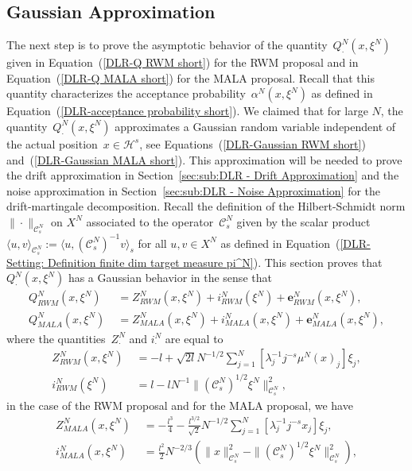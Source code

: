 \subsection{Gaussian Approximation}
\label{sec:sub:DLR - Gaussian approximation}

The next step is to prove the asymptotic behavior of the quantity~$Q^N_{\cdot}(x, \xi^N)$ given in Equation~(\ref{DLR-Q RWM short}) for the RWM proposal and in Equation~(\ref{DLR-Q MALA short}) for the MALA proposal. Recall that this quantity characterizes the acceptance probability~$\alpha^N(x, \xi^N)$ as defined in Equation~(\ref{DLR-acceptance probability short}). We claimed that for large $N$, the quantity~$Q^N_{\cdot}(x, \xi^N)$ approximates a Gaussian random variable independent of the actual position~$x \in \mathcal{H}^s$, see Equations~(\ref{DLR-Gaussian RWM short}) and~(\ref{DLR-Gaussian MALA short}). This approximation will be needed to prove the drift approximation in Section~\ref{sec:sub:DLR - Drift Approximation} and the noise approximation in Section~\ref{sec:sub:DLR - Noise Approximation} for the drift-martingale decomposition. Recall the definition of the Hilbert-Schmidt norm  $ \| \cdot \|_{\mathcal{C}_s^{N}} $ on $X^{N}$ associated to the operator~$\mathcal{C}_s^N$ given by the scalar product $ \langle u, v \rangle_{\mathcal{C}_s^{N}} := \langle u, ( \mathcal{C}_s^{N} )^{-1} v \rangle_s $ for all $ u,v \in X^{N} $ as defined in Equation~(\ref{DLR-Setting: Definition finite dim target measure pi^N}). This section proves that $Q^N_{\cdot}(x, \xi^N)$ has a Gaussian behavior in the sense that
\begin{align}
  \label{DLR-Definition Q^N_RWM as Gaussian}
 Q^N_{RWM}(x, \xi^N) & \; = Z^N_{RWM} (x, \xi^N) + i^N_{RWM}( \xi^N)+ \textbf{e}^N_{RWM}(x, \xi^N), \\
  \label{DLR-Definition Q^N_MALA as Gaussian}
 Q^N_{MALA}(x, \xi^N) & \; =  Z^N_{MALA} (x, \xi^N) + i^N_{MALA}(x, \xi^N) + \textbf{e}^N_{MALA}(x, \xi^N),
\end{align}
where the quantities~$Z^N_{\cdot}$ and $i^N_{\cdot}$ are equal to
\begin{align}
  Z^N_{RWM} (x, \xi^N) & \; = - l + \sqrt{2l} N^{-1/2} \sum_{j=1}^{N} \left[ \lambda_j^{-1} j^{-s} \mu^N(x)_j \right] \xi_j ,\\
  i^N_{RWM}( \xi^N) & \; = l  - l N^{-1} \|(\mathcal{C}^N_s)^{1/2} \xi^N \|_{\mathcal{C}^N_s}^2 ,
\end{align}
in the case of the RWM proposal and for the MALA proposal, we have
\begin{align}
  Z^N_{MALA} (x, \xi^N) & \; = -\frac{l^3}{4} - \frac{l^{3/2}}{\sqrt{2}} N^{-1/2} \sum_{j=1}^N  \left[ \lambda_j^{-1} j^{-s} x_j \right] \xi_j ,\\
  i^N_{MALA}(x, \xi^N) & \; =  \frac{l^2}{2} N^{-2/3} (\|x \|_{\mathcal{C}^N_s}^2 - \| (\mathcal{C}^N_s)^{1/2} \xi^N \|_{\mathcal{C}^N_s}^2) ,
\end{align}
